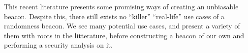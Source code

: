 This recent literature presents some promising ways of creating an unbiasable beacon. Despite this, there still exists no \enquote{killer} \enquote{real-life} use cases of a randomness beacon. We see many potential use cases, and present a variety of them with roots in the litterature, before constructing a beacon of our own and performing a security analysis on it.







